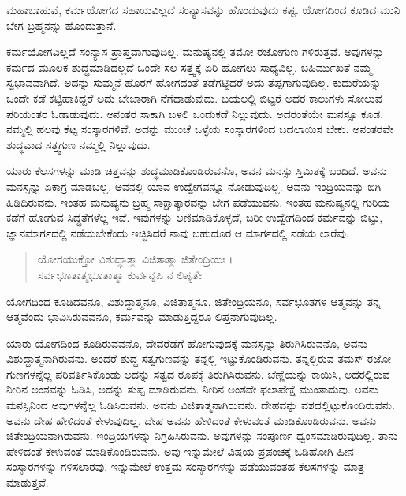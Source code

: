 {\small ಮಹಾಬಾಹುವೆ, ಕರ್ಮಯೋಗದ ಸಹಾಯವಿಲ್ಲದೆ ಸಂನ್ಯಾಸವನ್ನು ಹೊಂದುವುದು ಕಷ್ಟ. ಯೋಗದಿಂದ ಕೂಡಿದ ಮುನಿ ಬೇಗ ಬ್ರಹ್ಮನನ್ನು ಹೊಂದುತ್ತಾನೆ.}

ಕರ್ಮಯೋಗವಿಲ್ಲದೆ ಸಂನ್ಯಾಸ ಪ್ರಾಪ್ತವಾಗುವುದಿಲ್ಲ. ಮನುಷ್ಯನಲ್ಲಿ ತಮೋ ರಜೋಗುಣ ಗಳಿರುತ್ತವೆ. ಅವುಗಳನ್ನು ಕರ್ಮದ ಮೂಲಕ ಶುದ್ಧಮಾಡಿದಲ್ಲದೆ ಒಂದೇ ಸಲ ಸತ್ತ್ವಕ್ಕೆ ಏರಿ ಹೋಗಲು ಸಾಧ್ಯವಿಲ್ಲ. ಬಹಿರ್ಮುಖತೆ ನಮ್ಮ ಸ್ವಭಾವವಾಗಿದೆ. ಅದನ್ನು ಸುಮ್ಮನೆ ಹೊರಗೆ ಹೋಗದಂತೆ ತಡೆಗಟ್ಟಿದರೆ ಅದು ತೆಪ್ಪಗಾಗುವುದಿಲ್ಲ. ಕುದುರೆಯನ್ನು ಒಂದೇ ಕಡೆ ಕಟ್ಟಿಹಾಕಿದ್ದರೆ ಅದು ಬೇಜಾರಾಗಿ ನೆಗೆದಾಡುವುದು. ಬಯಲಲ್ಲಿ ಬಿಟ್ಟರೆ ಅದರ ಕಾಲುಗಳು ಸೋಲುವ ಪರಿಯಂತರ ಓಡಾಡುವುದು. ಅನಂತರ ಸಾಕಾಗಿ ಬಳಲಿ ಒಂದುಕಡೆ ನಿಲ್ಲುವುದು. ಅದರಂತೆಯೇ ಮನಸ್ಸೂ ಕೂಡ. ನಮ್ಮಲ್ಲಿ ಹಲವು ಕೆಟ್ಟ ಸಂಸ್ಕಾರಗಳಿವೆ. ಅದನ್ನು ಮುಂಚೆ ಒಳ್ಳೆಯ ಸಂಸ್ಕಾರಗಳಿಂದ ಬದಲಾಯಿಸ ಬೇಕು. ಅನಂತರವೇ ಶುದ್ಧವಾದ ಸತ್ತ್ವಗುಣ ನಮ್ಮಲ್ಲಿ ನಿಲ್ಲುವುದು.

ಯಾರು ಕೆಲಸಗಳನ್ನು ಮಾಡಿ ಚಿತ್ತವನ್ನು ಶುದ್ಧಮಾಡಿಕೊಂಡಿರುವನೊ, ಅವನ ಮನಸ್ಸು ಸ್ತಿಮಿತಕ್ಕೆ ಬಂದಿದೆ. ಅವನು ಮನಸ್ಸನ್ನು ಏಕಾಗ್ರ ಮಾಡಬಲ್ಲ. ಅವನಲ್ಲಿ ಯಾವ ಉದ್ವೇಗವನ್ನೂ ನೋಡುವುದಿಲ್ಲ. ಅವನು ಇಂದ್ರಿಯವನ್ನು ಬಿಗಿ ಹಿಡಿದಿರುವನು. ಇಂತಹ ಮನುಷ್ಯನು ಬ್ರಹ್ಮ ಸಾಕ್ಷಾತ್ಕಾರವನ್ನು ಬೇಗ ಪಡೆಯುವನು. ಇಂತಹ ಮನುಷ್ಯನಲ್ಲಿ ಗುರಿಯ ಕಡೆಗೆ ಹೋಗುವ ಸಿದ್ಧತೆಗಳೆಲ್ಲ ಇವೆ. ಇವುಗಳನ್ನು ಅಣಿಮಾಡಿಕೊಳ್ಳದೆ, ಬರೀ ಉದ್ವೇಗದಿಂದ ಕರ್ಮವನ್ನು ಬಿಟ್ಟು, ಜ್ಞಾನಮಾರ್ಗದಲ್ಲಿ ನಡೆಯಬೇಕೆಂದು ಇಚ್ಛಿಸಿದರೆ ನಾವು ಬಹುದೂರ ಆ ಮಾರ್ಗದಲ್ಲಿ ನಡೆಯ ಲಾರೆವು.\\

\begin{verse}
ಯೋಗಯುಕ್ತೋ ವಿಶುದ್ಧಾತ್ಮಾ ವಿಜಿತಾತ್ಮಾ ಜಿತೇಂದ್ರಿಯಃ ।\\ಸರ್ವಭೂತಾತ್ಮಭೂತಾತ್ಮಾ ಕುರ್ವನ್ನಪಿ ನ ಲಿಪ್ಯತೇ 
\end{verse}

ಯೋಗದಿಂದ ಕೂಡಿದವನೂ, ವಿಶುದ್ಧಾತ್ಮನೂ, ವಿಜಿತಾತ್ಮನೂ, ಜಿತೇಂದ್ರಿಯನೂ, ಸರ್ವಭೂತಗಳ ಆತ್ಮವನ್ನು ತನ್ನ ಆತ್ಮವೆಂದು ಭಾವಿಸಿರುವವನೂ, ಕರ್ಮವನ್ನು ಮಾಡುತ್ತಿದ್ದರೂ ಲಿಪ್ತನಾಗುವುದಿಲ್ಲ.

ಯಾರು ಯೋಗದಿಂದ ಕೂಡಿರುವವನೊ, ದೇವರೆಡೆಗೆ ಹೋಗುವುದಕ್ಕೆ ಮನಸ್ಸನ್ನು ತಿರುಗಿಸಿರುವನೊ, ಅವನು ವಿಶುದ್ಧಾತ್ಮನಾಗಿರುವನು. ಅಂದರೆ ಶುದ್ಧ ಸತ್ವಗುಣವನ್ನು ತನ್ನಲ್ಲಿ ಇಟ್ಟುಕೊಂಡಿರುವನು. ತನ್ನಲ್ಲಿರುವ ತಮಸ್ ರಜೋ ಗುಣಗಳನ್ನೆಲ್ಲ ಪರಿವರ್ತಿಸಿಕೊಂಡು ಅದನ್ನು ಸತ್ವದ ರೂಪಕ್ಕೆ ತಿರುಗಿಸಿರುವನು. ಬೆಣ್ಣೆಯನ್ನು ಕಾಯಿಸಿ, ಅದರಲ್ಲಿರುವ ನೀರಿನ ಅಂಶವನ್ನು ಓಡಿಸಿ, ಅದನ್ನು ತುಪ್ಪ ಮಾಡಿರುವನು. ನೀರಿನ ಅಂಶವೇ ಫಲಾಪೇಕ್ಷೆ ಮುಂತಾದುವು. ಅವನು ಮನಸ್ಸಿನಿಂದ ಅವುಗಳನ್ನೆಲ್ಲ ಓಡಿಸಿರುವನು. ಅವನು ವಿಜಿತಾತ್ಮನಾಗಿರುವನು. ದೇಹವನ್ನು ವಶದಲ್ಲಿಟ್ಟುಕೊಂಡಿರುವನು. ಅವನು ದೇಹ ಹೇಳಿದಂತೆ ಕೇಳುವುದಿಲ್ಲ. ದೇಹ ಅವನು ಹೇಳಿದಂತೆ ಕೇಳುವಂತೆ ಮಾಡಿಕೊಂಡಿರುವನು. ಅವನು ಜಿತೇಂದ್ರಿಯನಾಗಿರುವನು. ಇಂದ್ರಿಯಗಳನ್ನು ನಿಗ್ರಹಿಸಿರುವನು. ಅವುಗಳನ್ನು ಸಂಪೂರ್ಣ ಧ್ವಂಸಮಾಡಿರುವುದಿಲ್ಲ. ತಾನು ಹೇಳಿದಂತೆ ಕೇಳುವಂತೆ ಮಾಡಿಕೊಂಡಿರುವನು. ಅವು ಇನ್ನುಮೇಲೆ ವಿಷಯ ಪ್ರಪಂಚಕ್ಕೆ ಓಡಿಹೋಗಿ ಹೀನ ಸಂಸ್ಕಾರಗಳನ್ನು ಗಳಿಸಲಾರವು. ಇನ್ನುಮೇಲೆ ಉತ್ತಮ ಸಂಸ್ಕಾರಗಳನ್ನು ಪಡೆಯುವಂತಹ ಕೆಲಸಗಳನ್ನು ಮಾತ್ರ ಮಾಡುತ್ತವೆ.

